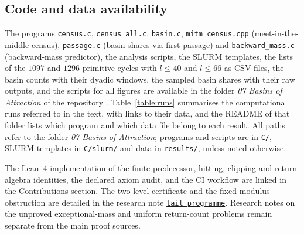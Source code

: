 \documentclass[12pt]{amsart}
\theoremstyle{definition}
\theoremstyle{remark}
\begin{document}
\subsection*{Code and data availability}
The programs \texttt{census.c}, \texttt{census\_all.c}, \texttt{basin.c}, \texttt{mitm\_census.cpp} (meet-in-the-middle census), \texttt{passage.c} (basin shares via first passage) and \texttt{backward\_mass.c} (backward-mass predictor), the analysis scripts, the SLURM templates, the lists of the $1097$ and $1296$ primitive cycles with $l\le40$ and $l\le66$ as CSV files, the basin counts with their dyadic windows, the sampled basin shares with their raw outputs, and the scripts for all figures are available in the folder \emph{07 Basins of Attraction} of the repository \cite{Sultanow_collatz_07}. Table~\ref{table:runs} summarises the computational runs referred to in the text, with links to their data, and the README of that folder lists which program and which data file belong to each result. All paths refer to the folder \emph{07 Basins of Attraction}; programs and scripts are in \texttt{C/}, SLURM templates in \texttt{C/slurm/} and data in \texttt{results/}, unless noted otherwise.

The Lean~4 implementation of the finite predecessor, hitting, clipping and return-algebra identities, the declared axiom audit, and the CI workflow are linked in the Contributions section. The two-level certificate and the fixed-modulus obstruction are detailed in the research note \href{https://github.com/Sultanow/collatz/tree/master/07\%20Basins\%20of\%20Attraction/docs/research/tail_programme}{\texttt{tail\_programme}}. Research notes on the unproved exceptional-mass and uniform return-count problems remain separate from the main proof sources.
\end{document}
